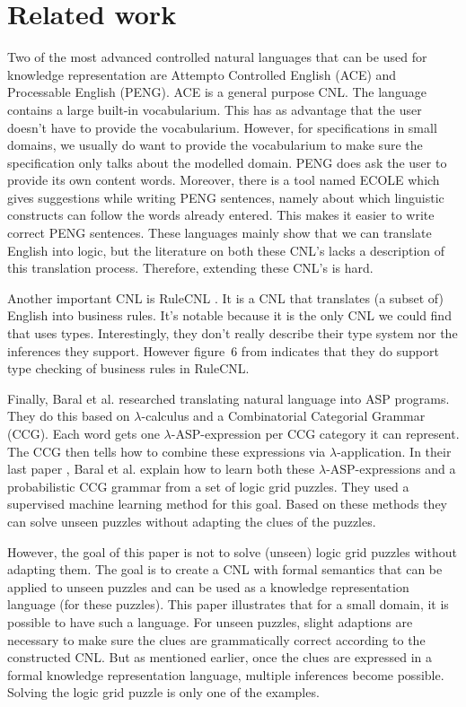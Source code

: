 \section{Related work}

Two of the most advanced controlled natural languages that can be used for knowledge representation are Attempto Controlled English (ACE) and Processable English (PENG). ACE \cite{Fuchs2008} is a general purpose CNL. The language contains a large built-in vocabularium. This has as advantage that the user doesn't have to provide the vocabularium. However, for specifications in small domains, we usually do want to provide the vocabularium to make sure the specification only talks about the modelled domain. PENG \cite{Schwitter2002} does ask the user to provide its own content words. Moreover, there is a tool named ECOLE which gives suggestions while writing PENG sentences, namely about which linguistic constructs can follow the words already entered. This makes it easier to write correct PENG sentences. These languages mainly show that we can translate English into logic, but the literature on both these CNL's lacks a description of this translation process. Therefore, extending these CNL's is hard.

Another important CNL is RuleCNL \cite{Njonko2014}. It is a CNL that translates (a subset of) English into business rules. It's notable because it is the only CNL we could find that uses types. Interestingly, they don't really describe their type system nor the inferences they support. However figure~6 from \cite{Njonko2014} indicates that they do support type checking of business rules in RuleCNL.

Finally, Baral et al. \cite{Baral2008, Costantini2010, Baral2012, Baral2012a} researched translating natural language into ASP programs. They do this based on $\lambda$-calculus and a Combinatorial Categorial Grammar (CCG). Each word gets one $\lambda$-ASP-expression per CCG category it can represent. The CCG then tells how to combine these expressions via $\lambda$-application. In their last paper \cite{Baral2012a}, Baral et al. explain how to learn both these $\lambda$-ASP-expressions and a probabilistic CCG grammar from a set of logic grid puzzles. They used a supervised machine learning method for this goal. Based on these methods they can solve unseen puzzles without adapting the clues of the puzzles.

However, the goal of this paper is not to solve (unseen) logic grid puzzles without adapting them. The goal is to create a CNL with formal semantics that can be applied to unseen puzzles and can be used as a knowledge representation language (for these puzzles). This paper illustrates that for a small domain, it is possible to have such a language. For unseen puzzles, slight adaptions are necessary to make sure the clues are grammatically correct according to the constructed CNL. But as mentioned earlier, once the clues are expressed in a formal knowledge representation language, multiple inferences become possible. Solving the logic grid puzzle is only one of the examples.
